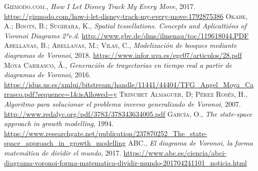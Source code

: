 \documentclass[12pt]{article}
\begin{document}



\clearpage
\begin{thebibliography}{9}
 \textsc{Gizmodo.com.}, \textit{How I Let Disney Track My Every Move}, 2017. \textcolor{blue}{\url{https://gizmodo.com/how-i-let-disney-track-my-every-move-1792875386}}	
 \textsc{Okabe, A.}; \textsc{Boots, B.}; \textsc{Sugihara, K.}, \textit{Spatial tessellations. Concepts and Aplicattións of Voronoi Diagrams 2ºe.d}. \textcolor{blue}{\url{http://www.gbv.de/dms/ilmenau/toc/119618044.PDF}}
 \textsc{Abellanas, B.}; \textsc{Abellanas, M.}; \textsc{Vilas, C.}, \textit{Modelización de bosques mediante diagramas de Voronoi}, 2018. \textcolor{blue}{\url{https://www.infor.uva.es/egc07/articulos/28.pdf}}
 \textsc{Moya Carrasco, Á.}, \textit{Generación de trayectorias en tiempo real a partir de diagramas de Voronoi}, 2016. \textcolor{blue}{\url{https://idus.us.es/xmlui/bitstream/handle/11441/44404/TFG_Angel_Moya_Carrasco.pdf?sequence=1&isAllowed=y}}
 \textsc{Trinchet Almaguer, D}; \textsc{Pérez Rosés, H.}, \textit{Algoritmo para solucionar el problema inverso generalizado de Voronoi}, 2007. \textcolor{blue}{\url{http://www.redalyc.org/pdf/3783/378343634005.pdf}}
 \textsc{García, O.}, \textit{The state-space approach in growth modelling}, 1994. \textcolor{blue}{\url{https://www.researchgate.net/publication/237870252_The_state-space_approach_in_growth_modelling}}
 \textsc{ABC.}, \textit{El diagrama de Voronoi, la forma matemática de dividir el mundo}, 2017. \textcolor{blue}{\url{https://www.abc.es/ciencia/abci-diagrama-voronoi-forma-matematica-dividir-mundo-201704241101_noticia.html}}
\end{thebibliography}
\end{document}
